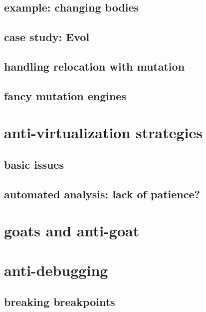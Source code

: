 \subsection{example: changing bodies}


\subsection{case study: Evol}


\subsection{handling relocation with mutation}


\subsection{fancy mutation engines}


\section{anti-virtualization strategies}
\subsection{basic issues}


\subsection{automated analysis: lack of patience?}


\section{goats and anti-goat}


\section{anti-debugging}


\subsection{breaking breakpoints}

